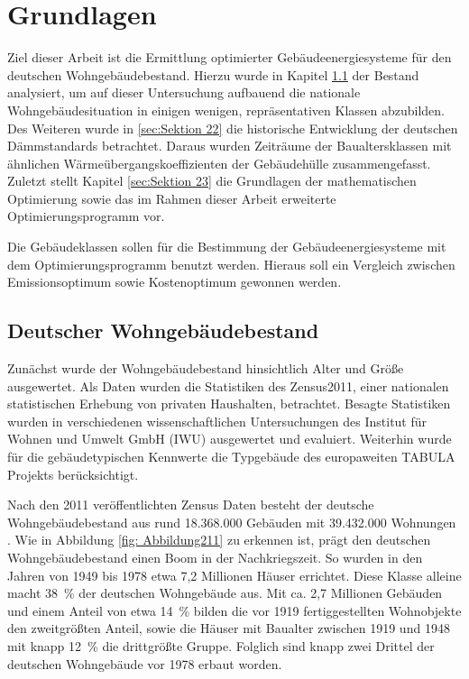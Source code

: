 \chapter{Grundlagen}

Ziel dieser Arbeit ist die Ermittlung optimierter Gebäudeenergiesysteme für den deutschen Wohngebäudebestand.
Hierzu wurde in Kapitel \ref{sec:Sektion 21} der Bestand analysiert, um auf dieser Untersuchung aufbauend die nationale Wohngebäudesituation in einigen wenigen, repräsentativen Klassen abzubilden. 
Des Weiteren wurde in \ref{sec:Sektion 22} die historische Entwicklung der deutschen Dämmstandards betrachtet. Daraus wurden Zeiträume der Baualtersklassen mit ähnlichen Wärmeübergangskoeffizienten der Gebäudehülle zusammengefasst. 
Zuletzt stellt Kapitel \ref{sec:Sektion 23} die Grundlagen der mathematischen Optimierung sowie das im Rahmen dieser Arbeit erweiterte Optimierungsprogramm vor. 

Die Gebäudeklassen sollen für die Bestimmung der Gebäudeenergiesysteme mit dem Optimierungsprogramm benutzt werden. 
Hieraus soll ein Vergleich zwischen Emissionsoptimum sowie Kostenoptimum gewonnen werden.



\section{Deutscher Wohngebäudebestand}
\label{sec:Sektion 21}

Zunächst wurde der Wohngebäudebestand hinsichtlich Alter und Größe ausgewertet.
Als Daten wurden die Statistiken des Zensus2011, einer nationalen statistischen Erhebung von privaten Haushalten, betrachtet. 
Besagte Statistiken wurden in verschiedenen wissenschaftlichen Untersuchungen des Institut für Wohnen und Umwelt GmbH (IWU) ausgewertet und evaluiert.
Weiterhin wurde für die gebäudetypischen Kennwerte die Typgebäude des europaweiten TABULA Projekts berücksichtigt.

Nach den 2011 veröffentlichten Zensus Daten besteht der deutsche Wohngebäudebestand aus rund 18.368.000 Gebäuden mit 39.432.000 Wohnungen \cite{.2015}.
Wie in Abbildung \ref{fig: Abbildung211} zu erkennen ist, prägt den deutschen Wohngebäudebestand einen Boom in der Nachkriegszeit. 
So wurden in den Jahren von 1949 bis 1978 etwa 7,2 Millionen Häuser errichtet. Diese Klasse alleine macht \mbox{38 \%} der deutschen Wohngebäude aus. 
Mit ca. 2,7 Millionen Gebäuden und einem Anteil von etwa \mbox{14 \%} bilden die vor 1919 fertiggestellten Wohnobjekte den zweitgrößten Anteil, sowie die Häuser mit Baualter zwischen 1919 und 1948 mit knapp \mbox{12 \%} die drittgrößte Gruppe.
Folglich sind knapp zwei Drittel der deutschen Wohngebäude vor 1978 erbaut worden.

